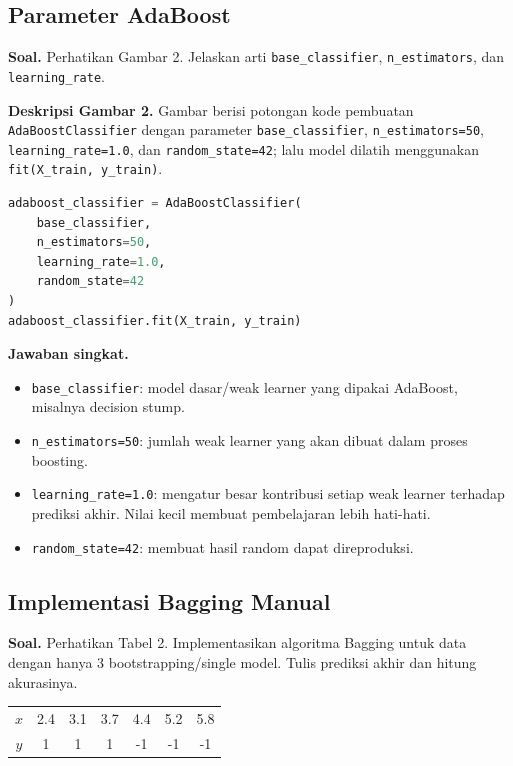 \documentclass[a4paper,10pt,twocolumn]{article}
\newcommand{\soal}[1]{\textbf{Soal.} #1}
\newcommand{\jawab}{\textbf{Jawaban singkat.} }
\begin{document}
\subsection{Parameter AdaBoost}

\soal{Perhatikan Gambar 2. Jelaskan arti \texttt{base\_classifier}, \texttt{n\_estimators}, dan \texttt{learning\_rate}.}

\textbf{Deskripsi Gambar 2.} Gambar berisi potongan kode pembuatan \texttt{AdaBoostClassifier} dengan parameter \texttt{base\_classifier}, \texttt{n\_estimators=50}, \texttt{learning\_rate=1.0}, dan \texttt{random\_state=42}; lalu model dilatih menggunakan \texttt{fit(X\_train, y\_train)}.

\begin{lstlisting}[language=Python]
adaboost_classifier = AdaBoostClassifier(
    base_classifier,
    n_estimators=50,
    learning_rate=1.0,
    random_state=42
)
adaboost_classifier.fit(X_train, y_train)
\end{lstlisting}

\jawab
\begin{itemize}
    \item \texttt{base\_classifier}: model dasar/weak learner yang dipakai AdaBoost, misalnya decision stump.
    \item \texttt{n\_estimators=50}: jumlah weak learner yang akan dibuat dalam proses boosting.
    \item \texttt{learning\_rate=1.0}: mengatur besar kontribusi setiap weak learner terhadap prediksi akhir. Nilai kecil membuat pembelajaran lebih hati-hati.
    \item \texttt{random\_state=42}: membuat hasil random dapat direproduksi.
\end{itemize}

\subsection{Implementasi Bagging Manual}

\soal{Perhatikan Tabel 2. Implementasikan algoritma Bagging untuk data dengan hanya 3 bootstrapping/single model. Tulis prediksi akhir dan hitung akurasinya.}

\begin{center}
\scriptsize
\begin{tabular}{c|cccccc}
\toprule
$x$ & 2.4 & 3.1 & 3.7 & 4.4 & 5.2 & 5.8 \\
$y$ & 1 & 1 & 1 & -1 & -1 & -1 \\
\bottomrule
\end{tabular}
\end{center}
\end{document}
